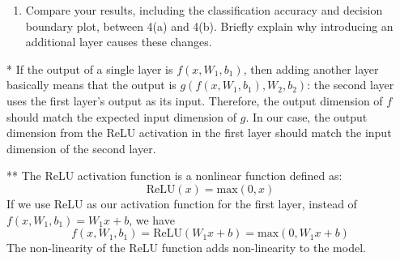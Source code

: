 \documentclass[a4paper]{article}
\begin{document}
\begin{enumerate}
\begin{enumerate}
* Use ReLU as activation functions for the first hidden layer.

** Connect outputs with a softmax function. Initialize your optimization procedure with all elements of $W$ being small random numbers and $b=0$. Use Cross Entropy loss. Train this model on the same two-dimensional dataset in (a).
		
Report your classification accuracy. Attach plots of the i) loss curve, ii) accuracy curve, and iii) decision boundary visualization in the report.
		
\item Compare your results, including the classification accuracy and decision boundary plot, between 4(a) and 4(b). Briefly explain why introducing an additional layer causes these changes. 
	
\end{enumerate}

* If the output of a single layer is $f(x, W_1, b_1)$, then adding another layer basically means that the output is $g(f(x, W_1, b_1), W_2, b_2)$: the second layer uses the first layer's output as its input. Therefore, the output dimension of $f$ should match the expected input dimension of $g$. In our case, the output dimension from the ReLU activation in the first layer should match the input dimension of the second layer.
	
	
** The ReLU activation function is a nonlinear function defined as:
\[
  \textrm{ReLU}(x) = \textrm{max}(0, x)  
\]
If we use ReLU as our activation function for the first layer, instead of $f(x, W_1,b_1) = W_1x+b$, we have
\[
    f(x, W_1, b_1) = \textrm{ReLU}(W_1x+b) = \textrm{max}(0, W_1x+b)
\]
The non-linearity of the ReLU function adds non-linearity to the model.
    
\end{enumerate}
\end{document}
